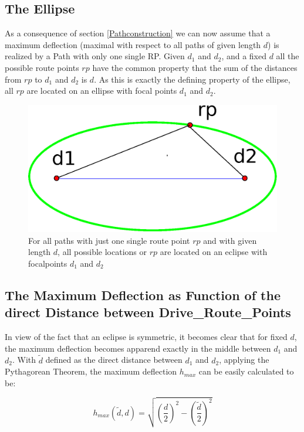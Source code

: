 \subsection{The Ellipse}

As a consequence of section \ref{Pathconstruction} we can now assume that a maximum deflection 
(maximal with respect to all paths of given length $d$) is realized by a Path with only one single RP. 
Given $d_1$ and $d_2$, and a fixed $d$ all the possible route points $rp$ have the common property
that the sum of the distances from $rp$ to $d_1$ and $d_2$ is $d$.
As this is exactly the defining property of the ellipse, all  $rp$ are located on an ellipse
with focal points $d_1$ and $d_2$.


\begin{figure}[h]
\includegraphics[scale=0.5]{images/03.04.ellipse.eps}
\caption{ For all paths with just one single route point $rp$ and with given length $d$,
	  all possible locations or $rp$ are located on an eclipse with focalpoints
	  $d_1$ and $d_2$	
	}
\end{figure}

\subsection{The Maximum Deflection as Function of the direct Distance between Drive\_Route\_Points}
In view of the fact that an eclipse is symmetric, it becomes clear that for fixed $d$, the maximum
deflection becomes apparend exactly in the middle between $d_1$ and $d_2$.
With $\tilde{d}$ defined as the direct distance between $d_1$ and $d_2$, applying the Pythagorean Theorem,
the maximum deflection $h_{max}$ can be easily calculated to be:

\begin{equation}
 \label{HMaxOfD}  
 h_{max}(\tilde{d},d)=\sqrt{ \left(\frac{d}{2}\right)^2 - \left(\frac{\tilde{d}}{2}\right)^2 }
\end{equation}

